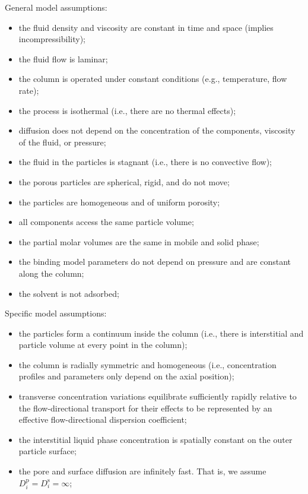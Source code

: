 \documentclass{article}
\begin{document}
General model assumptions:
\begin{itemize}
    \item the fluid density and viscosity are constant in time and space (implies incompressibility);
    \item the fluid flow is laminar;
    \item the column is operated under constant conditions (e.g., temperature, flow rate);
    \item the process is isothermal (i.e., there are no thermal effects);
    \item diffusion does not depend on the concentration of the components, viscosity of the fluid, or pressure;
    \item the fluid in the particles is stagnant (i.e., there is no convective flow);
    \item the porous particles are spherical, rigid, and do not move;
    \item the particles are homogeneous and of uniform porosity;
    \item all components access the same particle volume;
    \item the partial molar volumes are the same in mobile and solid phase;
    \item the binding model parameters do not depend on pressure and are constant along the column;
    \item the solvent is not adsorbed;
\end{itemize}

Specific model assumptions:
\begin{itemize}
    \item the particles form a continuum inside the column (i.e., there is interstitial and particle volume at every point in the column);
    \item the column is radially symmetric and homogeneous (i.e., concentration profiles and parameters only depend on the axial position);
    \item transverse concentration variations equilibrate sufficiently rapidly relative to the flow-directional transport for their effects to be represented by an effective flow-directional dispersion coefficient;
    \item the interstitial liquid phase concentration is spatially constant on the outer particle surface;
    \item the pore and surface diffusion are infinitely fast. That is, we assume $D^{\mathrm{p}}_{i} = D^{\mathrm{s}}_{i} = \infty$;
\end{itemize}
\end{document}
